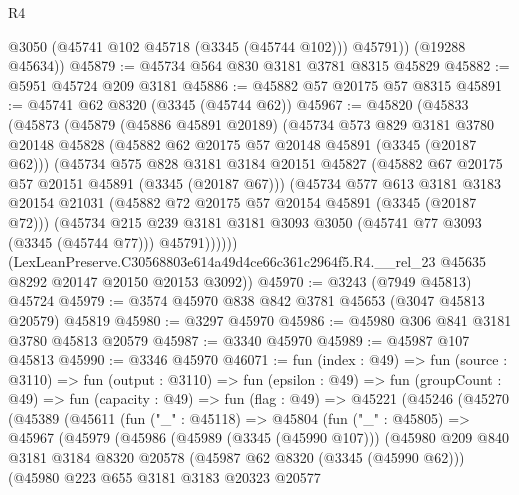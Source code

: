 \begin{lexlean}{R4}
\begin{coremodule}
          @3050
          (@45741 @102 @45718 (@3345 (@45744 @102)))
          @45791))
      (@19288 @45634))
@45879 := @45734 @564 @830 @3181 @3781 @8315 @45829
@45882 := @5951 @45724 @209 @3181
@45886 := @45882 @57 @20175 @57 @8315
@45891 := @45741 @62 @8320 (@3345 (@45744 @62))
@45967 := @45820
    (@45833
      (@45873
        (@45879
          (@45886 @45891 @20189)
          (@45734
            @573
            @829
            @3181
            @3780
            @20148
            @45828
            (@45882 @62 @20175 @57 @20148 @45891 (@3345 (@20187 @62)))
            (@45734
              @575
              @828
              @3181
              @3184
              @20151
              @45827
              (@45882 @67 @20175 @57 @20151 @45891 (@3345 (@20187 @67)))
              (@45734
                @577
                @613
                @3181
                @3183
                @20154
                @21031
                (@45882 @72 @20175 @57 @20154 @45891 (@3345 (@20187 @72)))
                (@45734
                  @215
                  @239
                  @3181
                  @3181
                  @3093
                  @3050
                  (@45741 @77 @3093 (@3345 (@45744 @77)))
                  @45791))))))
      (LexLeanPreserve.C30568803e614a49d4ce66c361c2964f5.R4.__rel_23
        @45635
        @8292
        @20147
        @20150
        @20153
        @3092))
@45970 := @3243 (@7949 @45813) @45724
@45979 := @3574 @45970 @838 @842 @3781 @45653 (@3047 @45813 @20579) @45819
@45980 := @3297 @45970
@45986 := @45980 @306 @841 @3181 @3780 @45813 @20579
@45987 := @3340 @45970
@45989 := @45987 @107 @45813
@45990 := @3346 @45970
@46071 := fun (index : @49) =>
  fun (source : @3110) =>
  fun (output : @3110) =>
  fun (epsilon : @49) =>
  fun (groupCount : @49) =>
  fun (capacity : @49) =>
  fun (flag : @49) =>
  @45221
    (@45246
      (@45270
        (@45389
          (@45611
            (fun ("_" : @45118) =>
            @45804
              (fun ("_" : @45805) =>
              @45967
                (@45979
                  (@45986
                    (@45989 (@3345 (@45990 @107)))
                    (@45980
                      @209
                      @840
                      @3181
                      @3184
                      @8320
                      @20578
                      (@45987 @62 @8320 (@3345 (@45990 @62)))
                      (@45980
                        @223
                        @655
                        @3181
                        @3183
                        @20323
                        @20577

\end{coremodule}
\end{lexlean}
